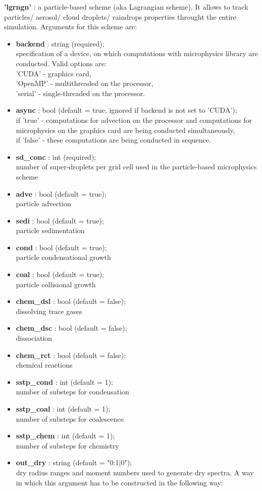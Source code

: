 \documentclass[11pt]{article}
\begin{document}
\begin{itemize}
\textbf{'lgrngn'} : a particle-based scheme (aka Lagrangian scheme). It allows to track particles/ aerosol/ cloud droplets/ raindrops properties throught the entire simulation. Arguments for this scheme are:
\begin{itemize}[label=$\bullet$]
\item \textbf{backend} : string (required); \\ specification of a device, on which computations with microphysics library are conducted. Valid options are: \\'CUDA' - graphics card, \\'OpenMP' - multithreaded on the processor, \\ 'serial' - single-threaded on the processor. 
\item \textbf{async} : bool (default = true, ignored if backend is not set to 'CUDA'); \\if 'true' - computations for advection on the processor and computations for microphysics on the graphics card are being conducted simultaneously,\\
if 'false' - these computations are being conducted in sequence.
\item \textbf{sd\_conc} : int (required); \\ number of super-droplets per grid cell used in the particle-based microphysics scheme
\item \textbf{adve} : bool (default = true); \\
particle advection
\item \textbf{sedi} : bool (default = true);\\
particle sedimentation
\item \textbf{cond} : bool (default = true);\\
particle condensational growth
\item \textbf{coal} : bool (default = true);\\
particle collisional growth
\item \textbf{chem\_dsl} : bool (default = false);\\
dissolving trace gases
\item \textbf{chem\_dsc} : bool (default = false);\\
dissociation
\item \textbf{chem\_rct} : bool (default = false);\\
chemical reactions
\item \textbf{sstp\_cond} : int (default = 1);\\
number of substeps for condensation
\item \textbf{sstp\_coal} : int (default = 1); \\
number of substeps for coalescence
\item \textbf{sstp\_chem} : int (default = 1); \\
number of substeps for chemistry
\item \textbf{out\_dry} : string (default = "0:1$|$0");\\
dry radius ranges and moment numbers used to generate dry spectra. A way in which this argument has to be constructed in the following way:\\


\end{itemize}
\end{itemize}
\end{document}
